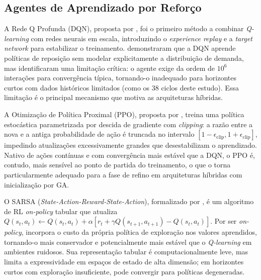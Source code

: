 \documentclass[a4paper,11pt]{article}
\begin{document}
\subsection{Agentes de Aprendizado por Reforço}


A Rede Q Profunda (DQN), proposta por \citet{mnih:2015}, foi o
primeiro método a combinar \textit{Q-learning} com redes neurais em escala,
introduzindo o \textit{experience replay} e a \textit{target network} para
estabilizar o treinamento. \citet{oroojlooyjadid:2022} demonstraram
que a DQN aprende políticas de reposição sem modelar explicitamente
a distribuição de demanda, mas identificaram uma limitação crítica:
o agente exige da ordem de $10^6$ interações para convergência típica,
tornando-o inadequado para horizontes curtos com dados históricos
limitados (como os 38 ciclos deste estudo). Essa limitação é o
principal mecanismo que motiva as arquiteturas híbridas.


A Otimização de Política Proximal (PPO), proposta por
\citet{schulman:2017}, treina uma política estocástica parametrizada
por descida de gradiente com \textit{clipping}: a razão entre a nova e
a antiga probabilidade de ação é truncada no intervalo
$[1-\epsilon_\text{clip}, 1+\epsilon_\text{clip}]$, impedindo
atualizações excessivamente grandes que desestabilizam o aprendizado.
Nativo de ações contínuas e com convergência mais estável que a DQN,
o PPO é, contudo, mais sensível ao ponto de partida do treinamento,
o que o torna particularmente adequado para a fase de refino em
arquiteturas híbridas com inicialização por GA.


O SARSA (\textit{State-Action-Reward-State-Action}), formalizado por
\citet{sutton:2018}, é um algoritmo de RL \textit{on-policy} tabular que
atualiza $Q(s_t, a_t) \leftarrow Q(s_t, a_t) + \alpha[r_t +
\gamma Q(s_{t+1}, a_{t+1}) - Q(s_t, a_t)]$. Por ser \textit{on-policy},
incorpora o custo da própria política de exploração nos valores
aprendidos, tornando-o mais conservador e potencialmente mais
estável que o \textit{Q-learning} em ambientes ruidosos. Sua representação
tabular é computacionalmente leve, mas limita a expressividade em
espaços de estado de alta dimensão; em horizontes curtos com
exploração insuficiente, pode convergir para políticas degeneradas.
\end{document}
